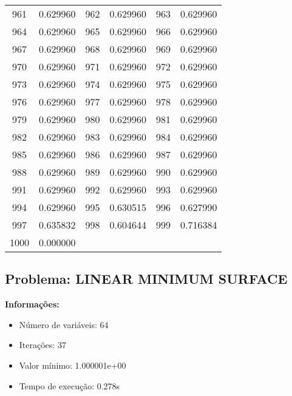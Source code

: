 \documentclass[12pt]{article}
\begin{document}
\begin{longtable}{@{}cc|cc|cc@{}}
961 & 0.629960 & 962 & 0.629960 & 963 & 0.629960 \\
964 & 0.629960 & 965 & 0.629960 & 966 & 0.629960 \\
967 & 0.629960 & 968 & 0.629960 & 969 & 0.629960 \\
970 & 0.629960 & 971 & 0.629960 & 972 & 0.629960 \\
973 & 0.629960 & 974 & 0.629960 & 975 & 0.629960 \\
976 & 0.629960 & 977 & 0.629960 & 978 & 0.629960 \\
979 & 0.629960 & 980 & 0.629960 & 981 & 0.629960 \\
982 & 0.629960 & 983 & 0.629960 & 984 & 0.629960 \\
985 & 0.629960 & 986 & 0.629960 & 987 & 0.629960 \\
988 & 0.629960 & 989 & 0.629960 & 990 & 0.629960 \\
991 & 0.629960 & 992 & 0.629960 & 993 & 0.629960 \\
994 & 0.629960 & 995 & 0.630515 & 996 & 0.627990 \\
997 & 0.635832 & 998 & 0.604644 & 999 & 0.716384 \\
1000 & 0.000000 &  &  &  &  \\

\end{longtable}


\newpage            
\subsection{Problema: LINEAR MINIMUM SURFACE}

\textbf{Informações:}
\begin{itemize}
\item Número de variáveis: 64
\item Iterações: 37
\item Valor mínimo: 1.000001e+00
\item Tempo de execução: 0.278s
\end{itemize}
\end{document}
